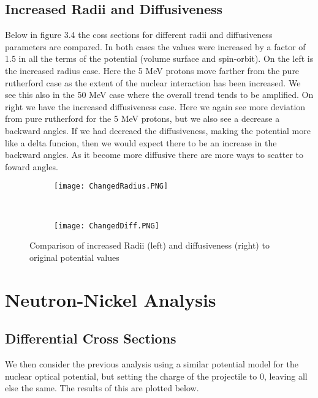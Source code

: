 \documentclass[paper=a4, fontsize=11pt]{scrartcl} %
\numberwithin{equation}{section} %
\numberwithin{figure}{section} %
\numberwithin{table}{section} %
\begin{document}
\subsection{Increased Radii and Diffusiveness}

Below in figure 3.4 the coss sections for different radii and diffusiveness parameters are compared.  In both cases the values were increased by a factor of 1.5 in all the terms of the potential (volume surface and spin-orbit).  On the left is the increased radius case.  Here the 5 MeV protons move farther from the pure rutherford case as the extent of the nuclear interaction has been increased.  We see this also in the 50 MeV case where the overall trend tends to be amplified.  On right we have the increased diffusiveness case.  Here we again see more deviation from pure rutherford for the 5 MeV protons, but we also see a decrease a backward angles.  If we had decreaed the diffusiveness, making the potential more like a delta funcion, then we would expect there to be an increase in the backward angles.  As it become more diffusive there are more ways to scatter to foward angles.

 \begin{figure}[hbt]
        \centering
        \begin{subfigure}[b!]{0.45\textwidth}
                \texttt{[image: ChangedRadius.PNG]}
        \end{subfigure}%
        ~ %
\quad
        \begin{subfigure}[b!]{0.45\textwidth}
                \texttt{[image: ChangedDiff.PNG]}
        \end{subfigure}

        \caption{Comparison of increased Radii (left) and diffusiveness (right) to original potential values}
\end{figure}




\section{Neutron-Nickel Analysis}
\subsection{Differential Cross Sections}
We then consider the previous analysis using a similar potential model for the nuclear optical potential, but setting the charge of the projectile to 0, leaving all else the same. The results of this are plotted below.\\
\end{document}
